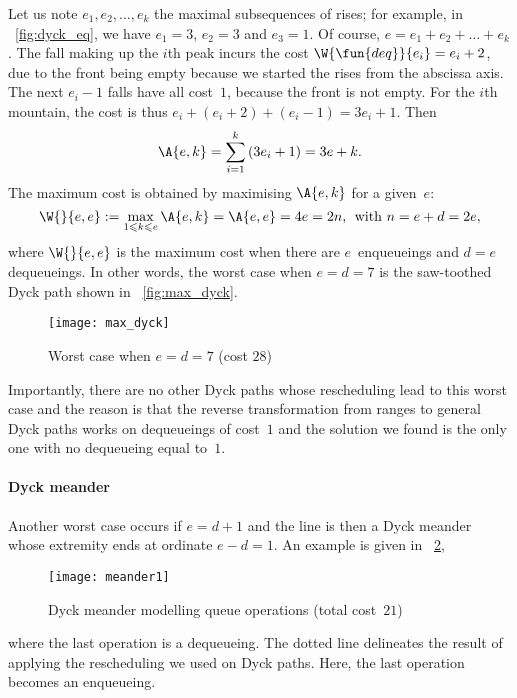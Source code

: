Let us note \(e_1, e_2, \dots, e_k\) the maximal subsequences of
rises; for example, in \fig~\ref{fig:dyck_eq}, we have \(e_1=3\),
\(e_2 = 3\) and \(e_3 = 1\). Of course, \(e = e_1 + e_2 + \dots +
e_k\). The fall making up the \(i\)th peak incurs the
cost \(\W{\fun{deq}}{e_i} = e_i + 2\),
due to the front being empty because we started the rises from the
abscissa axis. The next \(e_i-1\) falls have all cost~\(1\), because
the front is not empty. For the \(i\)th mountain, the cost is thus
\(e_i+(e_i+2)+(e_i-1) = 3e_i+1\). Then
\begin{equation*}
  \A{e,k} = \sum_{i=1}^{k}{(3e_i+1)} = 3e + k.
\end{equation*}
The maximum cost is obtained by maximising \(\A{e,k}\) for a
given~\(e\):
\begin{equation*}
\W{}{e,e} := \max_{1 \leqslant k \leqslant e}{\A{e,k}} = \A{e,e} = 4e
= 2n,\,\; \text{with \(n=e+d=2e\)},
\end{equation*}
where \(\W{}{e,e}\) is the maximum cost when there are
\(e\)~enqueueings and \({d=e}\) dequeueings. In other words, the worst
case when \(e=d=7\) is the saw\hyp{}toothed Dyck path shown in
\fig~\vref{fig:max_dyck}.
\begin{figure}
\centering
\texttt{[image: max\_dyck]}
\caption{Worst case when \(e=d=7\) (cost \(28\))}
\label{fig:max_dyck}
\end{figure}
Importantly, there are no other Dyck paths whose rescheduling lead to
this worst case and the reason is that the reverse transformation from
ranges to general Dyck paths works on dequeueings of cost~\(1\) and
the solution we found is the only one with no dequeueing equal
to~\(1\).

\paragraph{Dyck meander}

Another worst case occurs if \(e = d + 1\) and the line is then a Dyck
meander whose extremity ends at ordinate \(e-d=1\). An example is
given in \fig~\ref{fig:meander1},
\begin{figure}[b]
\centering
\texttt{[image: meander1]}
\caption{Dyck meander modelling queue operations (total cost~\(21\))}
\label{fig:meander1}
\end{figure}
where the last operation is a dequeueing. The dotted line delineates
the result of applying the rescheduling we used on Dyck paths. Here,
the last operation becomes an enqueueing.

